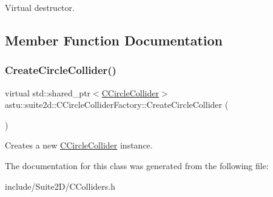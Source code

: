 Virtual destructor. 

\subsection{Member Function Documentation}
\mbox{\label{classastu_1_1suite2d_1_1CCircleColliderFactory_aa6a5f8005c8674ad1262619f085f6583}} 
\subsubsection{\texorpdfstring{Create\+Circle\+Collider()}{CreateCircleCollider()}}
{\footnotesize\ttfamily virtual std\+::shared\+\_\+ptr$<$\hyperlink{classastu_1_1suite2d_1_1CCircleCollider}{C\+Circle\+Collider}$>$ astu\+::suite2d\+::\+C\+Circle\+Collider\+Factory\+::\+Create\+Circle\+Collider (\begin{DoxyParamCaption}{ }\end{DoxyParamCaption})\hspace{0.3cm}{\ttfamily [pure virtual]}}

Creates a new \hyperlink{classastu_1_1suite2d_1_1CCircleCollider}{C\+Circle\+Collider} instance. 

The documentation for this class was generated from the following file\+:\begin{DoxyCompactItemize}
\item 
include/\+Suite2\+D/C\+Colliders.\+h\end{DoxyCompactItemize}
